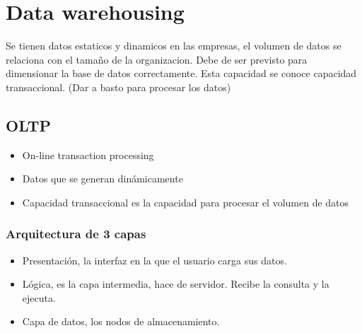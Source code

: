 \section{Data warehousing}

Se tienen datos estaticos y dinamicos en las empresas, el volumen de datos se relaciona con el tamaño de la organizacion. Debe de ser previsto para dimensionar la base de datos correctamente. Esta capacidad se conoce capacidad transaccional. (Dar a basto para procesar los datos)


\subsection*{OLTP}
\begin{itemize}
\item On-line transaction processing
\item Datos que se generan dinámicamente
\item Capacidad transaccional es la capacidad para procesar el volumen de datos
\end{itemize}


\subsubsection*{Arquitectura de 3 capas}
\begin{itemize}
\item Presentación, la interfaz en la que el usuario carga sus datos.
\item Lógica, es la capa intermedia, hace de servidor. Recibe la consulta y la ejecuta.
\item Capa de datos, los nodos de almacenamiento.
\end{itemize}


